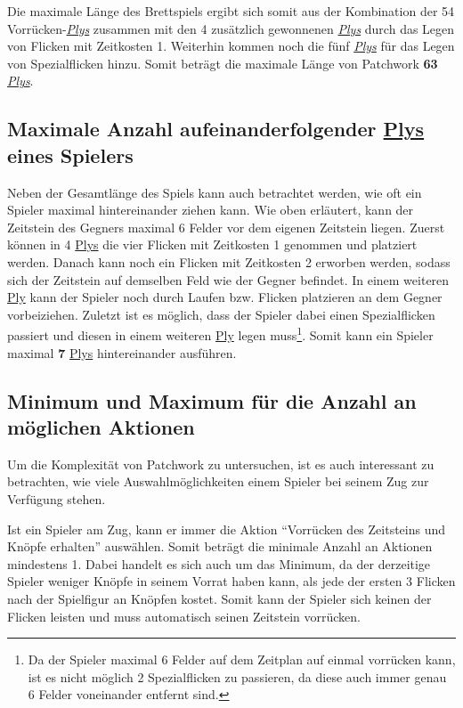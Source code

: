 Die maximale Länge des Brettspiels ergibt sich somit aus der Kombination der 54 Vorrücken-\hyperref[text:ply]{\emph{Plys}} zusammen mit den 4 zusätzlich gewonnenen \hyperref[text:ply]{\emph{Plys}} durch das Legen von Flicken mit Zeitkosten 1. Weiterhin kommen noch die fünf \hyperref[text:ply]{\emph{Plys}} für das Legen von Spezialflicken hinzu. Somit beträgt die maximale Länge von Patchwork \textbf{63} \hyperref[text:ply]{\emph{Plys}}.

\subsection*{Maximale Anzahl aufeinanderfolgender \hyperref[text:ply]{Plys} eines Spielers}
\label{subsection:analyse-maximale-anzahl-aufeinanderfolgender-plys}

Neben der Gesamtlänge des Spiels kann auch betrachtet werden, wie oft ein Spieler maximal hintereinander ziehen kann. Wie oben erläutert, kann der Zeitstein des Gegners maximal 6 Felder vor dem eigenen Zeitstein liegen. Zuerst können in 4 \hyperref[text:ply]{Plys} die vier Flicken mit Zeitkosten 1 genommen und platziert werden. Danach kann noch ein Flicken mit Zeitkosten 2 erworben werden, sodass sich der Zeitstein auf demselben Feld wie der Gegner befindet. In einem weiteren \hyperref[text:ply]{Ply} kann der Spieler noch durch Laufen bzw. Flicken platzieren an dem Gegner vorbeiziehen. Zuletzt ist es möglich, dass der Spieler dabei einen Spezialflicken passiert und diesen in einem weiteren \hyperref[text:ply]{Ply} legen muss\footnote{Da der Spieler maximal 6 Felder auf dem Zeitplan auf einmal vorrücken kann, ist es nicht möglich 2 Spezialflicken zu passieren, da diese auch immer genau 6 Felder voneinander entfernt sind.}. Somit kann ein Spieler maximal \textbf{7} \hyperref[text:ply]{Plys} hintereinander ausführen.

\subsection*{Minimum und Maximum für die Anzahl an möglichen Aktionen}

Um die Komplexität von Patchwork zu untersuchen, ist es auch interessant zu betrachten, wie viele Auswahlmöglichkeiten einem Spieler bei seinem Zug zur Verfügung stehen.

Ist ein Spieler am Zug, kann er immer die Aktion \enquote{Vorrücken des Zeitsteins und Knöpfe erhalten} auswählen. Somit beträgt die minimale Anzahl an Aktionen mindestens 1. Dabei handelt es sich auch um das Minimum, da der derzeitige Spieler weniger Knöpfe in seinem Vorrat haben kann, als jede der ersten 3 Flicken nach der Spielfigur an Knöpfen kostet. Somit kann der Spieler sich keinen der Flicken leisten und muss automatisch seinen Zeitstein vorrücken.

